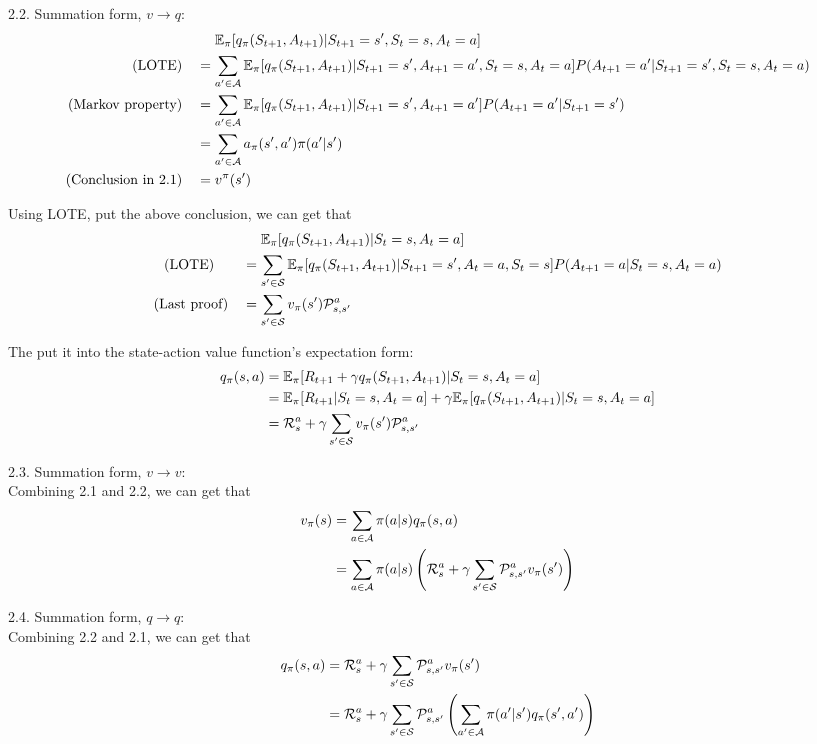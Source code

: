 \begin{homeworkProblem}
2.2. Summation form, $v\to q$:
\begin{align*}
&\quad\ \mathbb{E}_{\pi}[q_{\pi}(S_{t+1}, A_{t+1})|S_{t+1}=s', S_t=s, A_t=a] \\
\text{(LOTE)}\quad &= \sum_{a' \in \mathcal{A}} \mathbb{E}_{\pi}[q_{\pi}(S_{t+1}, A_{t+1})|S_{t+1}=s', A_{t+1}=a', S_t=s, A_t=a] P(A_{t+1}=a' | S_{t+1}=s', S_t=s, A_t=a) \\
\text{(Markov property)}\quad &= \sum_{a' \in \mathcal{A}} \mathbb{E}_{\pi}[q_{\pi}(S_{t+1}, A_{t+1})|S_{t+1}=s', A_{t+1}=a'] P( A_{t+1}=a' | S_{t+1}=s') \\
&= \sum_{a' \in \mathcal{A}} a_{\pi}(s',a')\pi(a'|s') \\
\text{(Conclusion in 2.1)}\quad &= v^{\pi}(s')
\end{align*}

Using LOTE, put the above conclusion, we can get that
\begin{align*}
&\quad\ \mathbb{E}_{\pi}[q_{\pi}(S_{t+1}, A_{t+1})| S_t=s, A_t=a] \\
\text{(LOTE)}\qquad &= \sum_{s' \in \mathcal{S}} \mathbb{E}_{\pi}[q_{\pi}(S_{t+1}, A_{t+1})|S_{t+1}=s', A_t=a, S_t=s] P( A_{t+1}=a | S_{t}=s, A_t=a) \\
\text{(Last proof)}\quad &= \sum_{s' \in \mathcal{S}} v_{\pi}(s')\mathcal{P}_{s,s'}^a
\end{align*}

The put it into the state-action value function's expectation form:
\begin{align*}
q_{\pi}(s,a) &= \mathbb{E}_{\pi}[R_{t+1}+\gamma q_{\pi}(S_{t+1}, A_{t+1})|S_t=s, A_t=a] \\
&= \mathbb{E}_{\pi}[R_{t+1}|S_t=s, A_t=a] + \gamma \mathbb{E}_{\pi}[q_{\pi}(S_{t+1}, A_{t+1})|S_t=s, A_t=a] \\
&= \mathcal{R}_s^a + \gamma \sum_{s' \in \mathcal{S}}v_{\pi}(s')\mathcal{P}_{s,s'}^a
\end{align*}

2.3. Summation form, $v\to v$: \\
Combining 2.1 and 2.2, we can get that
\begin{align*}
v_{\pi}(s) &= \sum_{a\in\mathcal{A}} \pi(a|s)q_{\pi}(s, a) \\
&= \sum_{a\in\mathcal{A}} \pi(a|s)\left(\mathcal{R}_s^a + \gamma \sum_{s' \in \mathcal{S}}\mathcal{P}_{s,s'}^av_{\pi}(s')\right)
\end{align*}

2.4. Summation form, $q\to q$: \\
Combining 2.2 and 2.1, we can get that
\begin{align*}
q_{\pi}(s,a) &= \mathcal{R}_s^a + \gamma \sum_{s' \in \mathcal{S}}\mathcal{P}_{s,s'}^av_{\pi}(s') \\
&= \mathcal{R}_s^a + \gamma \sum_{s' \in \mathcal{S}}\mathcal{P}_{s,s'}^a\left(\sum_{a'\in\mathcal{A}} \pi(a'|s')q_{\pi}(s', a')\right)
\end{align*}


\end{homeworkProblem}
